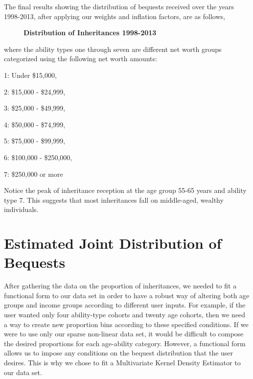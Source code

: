 \documentclass[letterpaper,12pt]{article}
\theoremstyle{definition}
\begin{document}
\begin{spacing}{1.5}
The final results showing the distribution of bequests received over the years 1998-2013, after applying our weights and inflation factors, are as follows,\\
\begin{figure}[htbp]\centering \captionsetup{width=4.0in}
    \caption{\label{proportions}\textbf{Distribution of Inheritances 1998-2013}}
  \end{figure}


where the ability types one through seven are different net worth groups categorized using the following
net worth amounts:

1: Under \$15,000,

2: \$15,000 - \$24,999,

3: \$25,000 - \$49,999,

4: \$50,000 - \$74,999,

5: \$75,000 - \$99,999,

6: \$100,000 - \$250,000,

7: \$250,000 or more

Notice the peak of inheritance reception at the age group 55-65 years and ability type 7. This suggests that most inheritances fall on middle-aged, wealthy individuals.

\section{Estimated Joint Distribution of Bequests}\label{SecDist}

  After gathering the data on the proportion of inheritances, we needed to fit a functional form to our data set in order to have a robust way of altering both age groups and income groups according to different user inputs. For example, if the user wanted only four ability-type cohorts and twenty age cohorts, then we need a way to create new proportion bins according to these specified conditions. If we were to use only our sparse non-linear data set, it would be difficult to compose the desired proportions for each age-ability category. However, a functional form allows us to impose any conditions on the bequest distribution that the user desires. This is why we chose to fit a Multivariate Kernel Density Estimator to our data set. 



\end{spacing}
\end{document}
